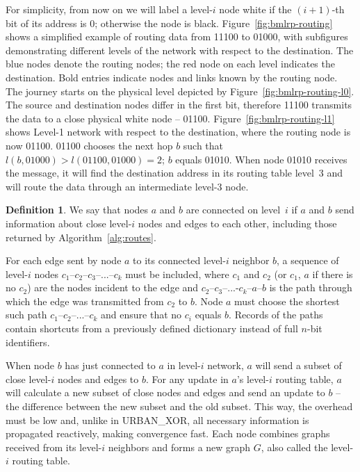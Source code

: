 \documentclass[conference]{IEEEtran}
\theoremstyle{definition}
\newtheorem{defn}{Definition}
\newcommand{\urbanxor}{URBAN\_XOR}
\begin{document}
For simplicity, from now on we will label a level-$i$ node white if the $(i+1)$-th bit of its address is 0; otherwise the node is black. Figure~\ref{fig:bmlrp-routing} shows a simplified example of routing data from 11100 to 01000, with subfigures demonstrating different levels of the network with respect to the destination. The blue nodes denote the routing nodes; the red node on each level indicates the destination. Bold entries indicate nodes and links known by the routing node. The journey starts on the physical level depicted by Figure~\ref{fig:bmlrp-routing-l0}. The source and destination nodes differ in the first bit, therefore 11100 transmits the data to a close physical white node -- 01100. Figure~\ref{fig:bmlrp-routing-l1} shows Level-1 network with respect to the destination, where the routing node is now 01100. 01100 chooses the next hop $b$ such that $l(b, 01000) > l(01100, 01000) = 2$; $b$ equals 01010. When node 01010 receives the message, it will find the destination address in its routing table level~3 and will route the data through an intermediate level-3 node.

\begin{defn}
    We say that nodes $a$ and $b$ are connected on level~$i$ if $a$ and $b$ send information about close level-$i$ nodes and edges to each other, including those returned by Algorithm~\ref{alg:routes}.
    
    \label{defn:connected}
\end{defn}

For each edge sent by node $a$ to its connected level-$i$ neighbor $b$, a sequence of level-$i$ nodes $c_1$--$c_2$--$c_3$--...--$c_k$ must be included, where $c_1$ and $c_2$ (or $c_1$, $a$ if there is no $c_2$) are the nodes incident to the edge and $c_2$--$c_3$--...-$c_k$--$a$--$b$ is the path through which the edge was transmitted from $c_2$ to $b$. Node $a$ must choose the shortest such path $c_1$--$c_2$--...--$c_k$ and ensure that no $c_i$ equals $b$. Records of the paths contain shortcuts from a previously defined dictionary instead of full $n$-bit identifiers.

When node $b$ has just connected to $a$ in level-$i$ network, $a$ will send a subset of close level-$i$ nodes and edges to $b$. For any update in $a$'s level-$i$ routing table, $a$ will calculate a new subset of close nodes and edges and send an update to $b$ -- the difference between the new subset and the old subset. This way, the overhead must be low and, unlike in \urbanxor, all necessary information is propagated reactively, making convergence fast. Each node combines graphs received from its level-$i$ neighbors and forms a new graph $G$, also called the level-$i$ routing table.
\end{document}
